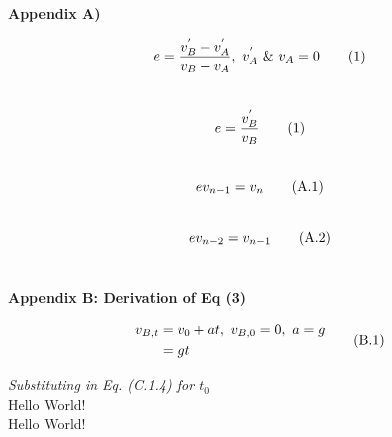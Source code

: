 \documentclass[x11names]{article}
\begin{document}
\renewcommand{\baselinestretch}{2.0}
\setcounter{page}{11}

\begin{center}
\textbf{Appendix A)}
\end{center}

\begin{equation}
e = \frac{v_B^{'} - v_A^{'}}{v_B - v_A}, \ v_A^{'} \ \& \ v_A = 0 \tag{1}\\
\end{equation}\\
\begin{equation}
e = \frac{v_B^{'}}{v_B}\tag{1}\\
\end{equation}\\
\begin{equation}
ev_{n-1} = v_n \tag{A.1}\\
\end{equation}\\
\begin{equation}
ev_{n-2} =v_{n-1} \tag{A.2}\\
\end{equation}\\


\pagebreak
\begin{center}
\textbf{Appendix B: Derivation of Eq (3)}
\end{center}

\begin{equation}
\begin{aligned} \nonumber
v_{B,t} & = v_0 + at, \ v_{B,0} = 0,  \ a = g\\ \nonumber 
	   & = gt
\end{aligned}\\ \tag{B.1}
\end{equation}

\noindent \textit{Substituting in Eq. (C.1.4) for $t_0$}\\


\textcolor{Firebrick1}{Hello World!}\\
\colorbox{Thistle3}{Hello World!}\\
\end{document}
